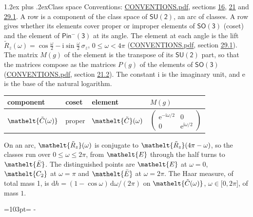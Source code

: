 \documentclass[10pt,a4paper]{article}
\makeatletter
\renewcommand\section{\@startsection{section}{1}{\z@}{-3ex plus -1ex minus -.2ex}%
  {1.2ex plus .2ex}{\normalfont\large\sffamily\bfseries\color{parttitle}}}
\newcommand{\needspace}[1]{\par\penalty-100\begingroup\dimen0=#1\relax\dimen2=\pagegoal
  \advance\dimen2-\pagetotal\ifdim\dimen0>\dimen2\relax\ifdim\dimen2>0pt\vfil\break\fi\fi
  \endgroup}
\numberwithin{equation}{section}
\newcommand{\eltfont}[1]{{\let\sigma\eltsigma\mathelt{#1}}}
\newcommand{\grp}[1]{\mathsf{#1}}
\newcommand{\cls}[1]{\eltfont{#1}}
\newcommand{\comp}[1]{\eltfont{#1}}
\newcommand{\elt}[1]{\eltfont{#1}}
\newcommand{\iunit}{\mathrm{i}}
\newcommand{\expe}{\mathrm{e}}
\newcommand{\diff}{\mathrm{d}}
\newcommand{\barred}[1]{\bar{#1}}
\newcommand{\lift}[1]{\tilde{#1}}
\newcommand{\pauli}[1]{\sigma_{#1}}
\makeatother
\begin{document}
\section{Class space}\label{s:class_space}
Conventions: \href{../../CONVENTIONS.pdf}{CONVENTIONS.pdf}, sections \href{../../../rotation/CONVENTIONS.pdf\#conv.16}{16}, \href{../../CONVENTIONS.pdf\#conv.21}{21} and \href{../../CONVENTIONS.pdf\#conv.29.1}{29.1}.
\leavevmode\label{n:head.component}A row is a component of the class space of $\grp{SU(2)}$, an arc of classes. \label{n:head.coset}\label{n:head.element}A row gives whether its elements cover proper or improper elements of \href{../../../rotation/data/pdf/SO3.pdf}{$\grp{SO(3)}$} (coset) and the element of $\grp{Pin^{-}(3)}$ at its angle. \label{n:angle.omega}The element at each angle is the lift $\lift{R}_z(\omega) = \cos\tfrac{\omega}{2} - \iunit\sin\tfrac{\omega}{2}\,\pauli{z}$, $0 \le \omega < 4\pi$ (\href{../../CONVENTIONS.pdf}{CONVENTIONS.pdf}, section \href{../../CONVENTIONS.pdf\#conv.29.1}{29.1}). \label{n:matrix.element.pin}The matrix $M(g)$ of the element is the transpose of its $\grp{SU(2)}$ part, so that the matrices compose as the matrices $P(g)$ of the elements of \href{../../../rotation/data/pdf/SO3.pdf}{$\grp{SO(3)}$} (\href{../../CONVENTIONS.pdf}{CONVENTIONS.pdf}, section \href{../../CONVENTIONS.pdf\#conv.21.2}{21.2}).
The constant $\iunit$ is the imaginary unit, and $\expe$ is the base of the natural logarithm.
\begin{center}\begin{tabular}{@{}llll@{}}\toprule
component & coset & element & $M(g)$\\\midrule
$\comp{\lift{C}(\omega)}$ & proper & $\elt{\lift{C}}(\omega)$ & $\left(\begin{smallmatrix}\expe^{-\iunit\omega/2} & 0\\ 0 & \expe^{\iunit\omega/2}\end{smallmatrix}\right)$\\
\bottomrule\end{tabular}\end{center}
On an arc, $\elt{\lift{R}_z}(\omega)$ is conjugate to $\elt{\lift{R}_z}(4\pi - \omega)$, so the classes run over $0 \le \omega \le 2\pi$, from $\cls{E}$ through the half turns to $\cls{\barred{E}}$.
The distinguished points are $\cls{E}$ at $\omega = 0$, $\cls{C_2}$ at $\omega = \pi$ and $\cls{\barred{E}}$ at $\omega = 2\pi$.
\leavevmode\label{n:local.haar.h}The Haar measure, of total mass 1, is $\diff h = (1 - \cos\omega)\,\diff\omega/(2\pi)$ on $\comp{\lift{C}(\omega)}$, $\omega\in\bigl[0, 2\pi\bigr]$, of mass $1$.
\needspace{103pt}
\end{document}
